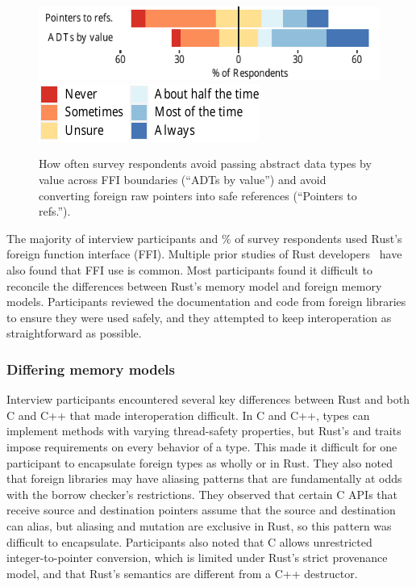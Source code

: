 
\begin{figure}
\centering
\caption{How often survey respondents avoid passing abstract data types by value across FFI boundaries (``ADTs by value'') and avoid converting foreign raw pointers into safe references (``Pointers to refs.'').}
\label{fig:rq4:types}
\includegraphics[width=\columnwidth]{figures/compiled/rq4_frequency_unsure.pdf}
\includegraphics{figures/compiled/legends/legend_frequency_unsure_wrapped.pdf}
\end{figure}


The majority of interview participants and \% of survey respondents used Rust's foreign function interface (FFI). Multiple prior studies of Rust developers~\cite{holtervennhoff23,fulton21,astrauskas20} have also found that FFI use is common. Most participants found it difficult to reconcile the differences between Rust's memory model and foreign memory models. Participants reviewed the documentation and code from foreign libraries to ensure they were used safely, and they attempted to keep interoperation as straightforward as possible.


\subsubsection{Differing memory models}
Interview participants encountered several key differences between Rust and both C and C++ that made interoperation difficult. In C and C++, types can implement methods with varying thread-safety properties, but Rust's  and  traits impose requirements on every behavior of a type. This made it difficult for one participant to encapsulate foreign types as wholly  or  in Rust. They also noted that foreign libraries may have aliasing patterns that are fundamentally at odds with the borrow checker's restrictions. They observed that certain C APIs that receive source and destination pointers assume that the source and destination can alias, but aliasing and mutation are exclusive in Rust, so this pattern was difficult to encapsulate. Participants also noted that C allows unrestricted integer-to-pointer conversion, which is limited under Rust's strict provenance model, and that Rust's  semantics are different from a C++ destructor. 

